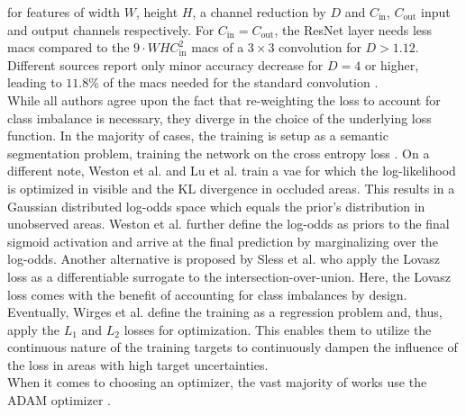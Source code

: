 for features of width $W$, height $H$, a channel reduction by $D$ and $C_{\text{in}}$, $C_{\text{out}}$ input and output channels respectively. For $C_{\text{in}} = C_{\text{out}}$, the ResNet layer needs less \gls{mac}s compared to the $9\cdot WHC_{\text{in}}^2$ \gls{mac}s of a $3 \times 3$ convolution for $D > 1.12$. Different sources report only minor accuracy decrease for $D = 4$ or higher, leading to $11.8\%$ of the \gls{mac}s needed for the standard convolution \cite{he2016deep,Bazarevsky2018}. 
\\
While all authors agree upon the fact that re-weighting the loss to account for class imbalance is necessary, they diverge in the choice of the underlying loss function. In the majority of cases, the training is setup as a semantic segmentation problem, training the network on the cross entropy loss \cite{prophet2019semantic,lombacher2017semantic,hendy2020fishing,wulff2018early}. On a different note, Weston et al. \cite{weston2019probably} and Lu et al. \cite{lu2019monocular} train a \gls{vae} \cite{kingma2013auto} for which the log-likelihood is optimized in visible and the KL divergence in occluded areas. This results in a Gaussian distributed log-odds space which equals the prior's distribution in unobserved areas. Weston et al. further define the log-odds as priors to the final sigmoid activation and arrive at the final prediction by marginalizing over the log-odds. Another alternative is proposed by Sless et al. \cite{sless2019road} who apply the Lovasz loss \cite{berman2018lovasz} as a differentiable surrogate to the intersection-over-union. Here, the Lovasz loss comes with the benefit of accounting for class imbalances by design. Eventually, Wirges et al. \cite{wirges2018evidential} define the training as a regression problem and, thus, apply the $L_1$ and $L_2$ losses for optimization. This enables them to utilize the continuous nature of the training targets to continuously dampen the influence of the loss in areas with high target uncertainties.\\
When it comes to choosing an optimizer, the vast majority of works use the ADAM optimizer \cite{kingma2014adam,verdoja2019deep,wirges2018evidential,weston2019probably,schulter2018learning}.
%
